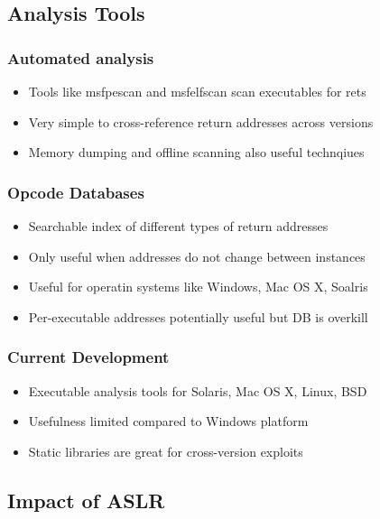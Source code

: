 \documentclass{beamer}
\begin{document}
\subsection{Analysis Tools}
\begin{frame}
	\frametitle{Automated analysis}
	\begin{itemize}
		\item Tools like msfpescan and msfelfscan scan executables for rets
		\item Very simple to cross-reference return addresses across versions
		\item Memory dumping and offline scanning also useful technqiues
	\end{itemize}	
\end{frame}

\begin{frame}
	\frametitle{Opcode Databases}
	\begin{itemize}
		\item Searchable index of different types of return addresses
		\item Only useful when addresses do not change between instances
		\item Useful for operatin systems like Windows, Mac OS X, Soalris
		\item Per-executable addresses potentially useful but DB is overkill
	\end{itemize}	
\end{frame}

\begin{frame}
	\frametitle{Current Development}
	\begin{itemize}
		\item Executable analysis tools for Solaris, Mac OS X, Linux, BSD
		\item Usefulness limited compared to Windows platform
		\item Static libraries are great for cross-version exploits
	\end{itemize}	
\end{frame}

\subsection{Impact of ASLR}
\end{document}
